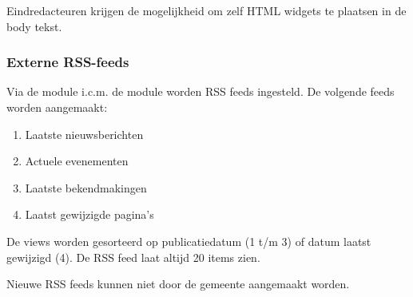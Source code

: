 Eindredacteuren krijgen de mogelijkheid om zelf HTML widgets te plaatsen in de body tekst.

\subsubsection{Externe RSS-feeds}

Via de  module i.c.m. de  module worden RSS feeds ingesteld. De volgende feeds worden aangemaakt:
\begin{enumerate}
\item Laatste nieuwsberichten
\item Actuele evenementen
\item Laatste bekendmakingen
\item Laatst gewijzigde pagina's
\end{enumerate}
De views worden gesorteerd op publicatiedatum (1 t/m 3) of datum laatst gewijzigd (4). De RSS feed laat altijd 20 items zien.

Nieuwe RSS feeds kunnen niet door de gemeente aangemaakt worden.

